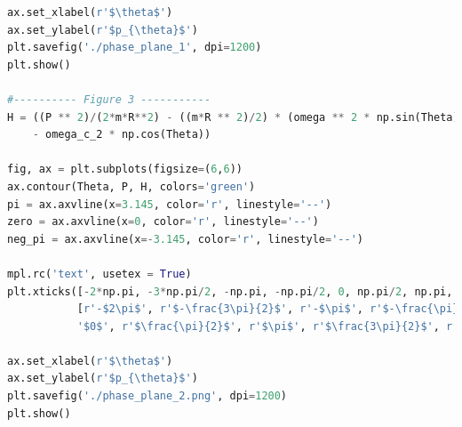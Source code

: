 \documentclass[12pt]{article}
\begin{document}
\begin{lstlisting}[language=Python, caption=Python Graphs]
ax.set_xlabel(r'$\theta$')
ax.set_ylabel(r'$p_{\theta}$')
plt.savefig('./phase_plane_1', dpi=1200)
plt.show()

#---------- Figure 3 -----------
H = ((P ** 2)/(2*m*R**2) - ((m*R ** 2)/2) * (omega ** 2 * np.sin(Theta) ** 2) 
    - omega_c_2 * np.cos(Theta))

fig, ax = plt.subplots(figsize=(6,6))
ax.contour(Theta, P, H, colors='green')
pi = ax.axvline(x=3.145, color='r', linestyle='--')
zero = ax.axvline(x=0, color='r', linestyle='--')
neg_pi = ax.axvline(x=-3.145, color='r', linestyle='--')

mpl.rc('text', usetex = True)
plt.xticks([-2*np.pi, -3*np.pi/2, -np.pi, -np.pi/2, 0, np.pi/2, np.pi, 3*np.pi/2, 2*np.pi],
           [r'-$2\pi$', r'$-\frac{3\pi}{2}$', r'-$\pi$', r'$-\frac{\pi}{2}$', 
           '$0$', r'$\frac{\pi}{2}$', r'$\pi$', r'$\frac{3\pi}{2}$', r'$2\pi$'])

ax.set_xlabel(r'$\theta$')
ax.set_ylabel(r'$p_{\theta}$')
plt.savefig('./phase_plane_2.png', dpi=1200)
plt.show()

\end{lstlisting}


 
\end{document}
